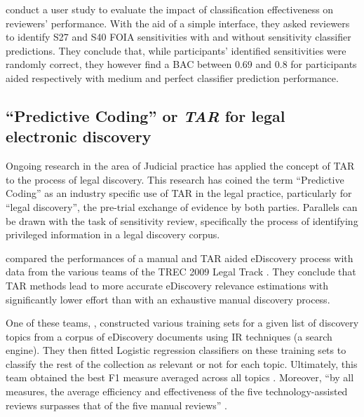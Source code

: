 \documentclass[\version]{l4proj}
\begin{document}
\textcite{mcdonaldHowSensitivityClassification2019} conduct a user study to evaluate the impact of classification effectiveness on reviewers' performance. With the aid of a simple interface, they asked reviewers to identify S27 and S40 FOIA sensitivities with and without sensitivity classifier predictions.
They conclude that, while participants' identified sensitivities were randomly correct, they however find a BAC between 0.69 and 0.8 for participants aided respectively with medium and perfect classifier prediction performance.

\subsection{``Predictive Coding'' or \textit{TAR} for legal electronic discovery}

Ongoing research in the area of Judicial practice has applied the concept of TAR to the process of legal discovery.
This research has coined the term ``Predictive Coding'' \autocite{carrollGrossmancormackGlossaryTechnologyassisted2013} as an industry specific use of TAR in the legal practice, particularly for ``legal discovery'', the pre-trial exchange of evidence by both parties.
Parallels can be drawn with the task of sensitivity review, specifically the process of identifying privileged information in a legal discovery corpus.

\textcite{grossmanTechnologyAssistedReviewEDiscovery2010} compared the performances of a manual and TAR aided eDiscovery process with data from the various teams of the TREC 2009 Legal Track \autocite{hedinOverviewTREC2009}.
They conclude that TAR methods lead to more accurate eDiscovery relevance estimations with significantly lower effort than with an exhaustive manual discovery process.

One of these teams, \textcite{cormackMachineLearningInformation2009}, constructed various training sets for a given list of discovery topics from a corpus of eDiscovery documents using IR techniques (a search engine).
They then fitted Logistic regression classifiers on these training sets to classify the rest of the collection as relevant or not for each topic.
Ultimately, this team obtained the best F1 measure averaged across all topics \autocite{hedinOverviewTREC2009}.
Moreover, ``by all measures, the average efficiency and effectiveness of the five technology-assisted reviews surpasses that of the five manual reviews'' \autocite[p.~43]{grossmanTechnologyAssistedReviewEDiscovery2010}.
\end{document}
